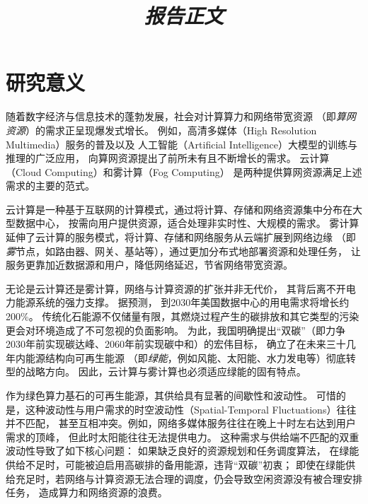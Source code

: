 \title{\emph{ 报告正文}}
\maketitle
\thispagestyle{empty}



\section{研究意义}

随着数字经济与信息技术的蓬勃发展，社会对计算算力和网络带宽资源
（即\emph{算网资源}）的需求正呈现爆发式增长。
例如，高清多媒体（High Resolution Multimedia）服务的普及以及
人工智能（Artificial Intelligence）大模型的训练与推理的广泛应用，
向算网资源提出了前所未有且不断增长的需求。
云计算（Cloud Computing）和雾计算（Fog Computing）
是两种提供算网资源满足上述需求的主要的范式。

云计算是一种基于互联网的计算模式，通过将计算、存储和网络资源集中分布在大型数据中心，
按需向用户提供资源，适合处理非实时性、大规模的需求。
雾计算延伸了云计算的服务模式，将计算、存储和网络服务从云端扩展到网络边缘
（即\emph{雾}节点，如路由器、网关、基站等），通过更加分布式地部署资源和处理任务，
让服务更靠加近数据源和用户，降低网络延迟，节省网络带宽资源。

无论是云计算还是雾计算，网络与计算资源的扩张并非无代价，
其背后离不开电力能源系统的强力支撑。
据预测\cite{shehabi2024UnitedStates2024}，
到2030年美国数据中心的用电需求将增长约200\%。
传统化石能源不仅储量有限，其燃烧过程产生的碳排放和其它类型的污染
更会对环境造成了不可忽视的负面影响。
为此，我国明确提出“双碳”（即力争2030年前实现碳达峰、2060年前实现碳中和）的宏伟目标，
确立了在未来三十几年内能源结构向可再生能源
（即\emph{绿能}，例如风能、太阳能、水力发电等）彻底转型的战略方向。
因此，云计算与雾计算也必须适应绿能的固有特点。

作为绿色算力基石的可再生能源，其供给具有显著的间歇性和波动性。
可惜的是，这种波动性与用户需求的时空波动性（Spatial-Temporal Fluctuations）往往并不匹配，
甚至互相冲突。例如，网络多媒体服务往往在晚上十时左右达到用户需求的顶峰，
但此时太阳能往往无法提供电力。
这种需求与供给端不匹配的双重波动性导致了如下核心问题：
如果缺乏良好的资源规划和任务调度算法，
在绿能供给不足时，可能被迫启用高碳排的备用能源，违背“双碳”初衷；
即使在绿能供给充足时，若网络与计算资源无法合理的调度，仍会导致空闲资源没有被合理安排任务，
造成算力和网络资源的浪费。

